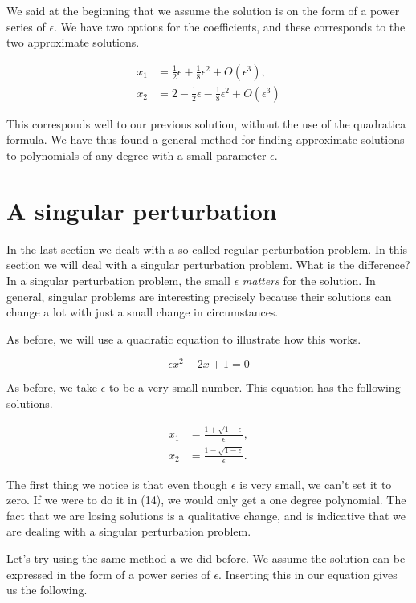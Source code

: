 \documentclass[12pt]{article}
\begin{document}
We said at the beginning that we assume the solution is on the form of a power
series of $\epsilon$. We have two options for the coefficients, and these
corresponds to the two approximate solutions.

\begin{align}
x_1 &= \frac{1}{2} \epsilon + \frac{1}{8} \epsilon^2 + O(\epsilon^3), \\
x_2 &= 2 - \frac{1}{2} \epsilon - \frac{1}{8} \epsilon^2 + O(\epsilon^3)
\end{align}

This corresponds well to our previous solution, without the use of the
quadratica formula. We have thus found a general method for finding approximate
solutions to polynomials of any degree with a small parameter $\epsilon$.

\section{A singular perturbation}

In the last section we dealt with a so called regular perturbation problem. In this section
we will deal with a singular perturbation problem. What is the difference? In a
singular perturbation problem, the small $\epsilon$ \textit{matters} for the
solution. In general, singular problems are interesting precisely
because their solutions can change a lot with just a small change in
circumstances.

As before, we will use a quadratic equation to illustrate how this works.

\begin{equation}
\epsilon x^2 - 2 x + 1 = 0
\end{equation}

As before, we take $\epsilon$ to be a very small number. This equation has the
following solutions.

\begin{align}
x_1 &= \frac{1 + \sqrt{1 - \epsilon}}{\epsilon}, \\
x_2 &= \frac{1 - \sqrt{1 - \epsilon}}{\epsilon}.
\end{align}

The first thing we notice is that even though $\epsilon$ is very small, we can't
set it to zero. If we were to do it in (14), we would only get a one degree
polynomial. The fact that we are losing solutions is a qualitative change, and
is indicative that we are dealing with a singular perturbation problem.

Let's try using the same method a we did before. We assume the solution can
be expressed in the form of a power series of $\epsilon$. Inserting this in our
equation gives us the following.
\end{document}
